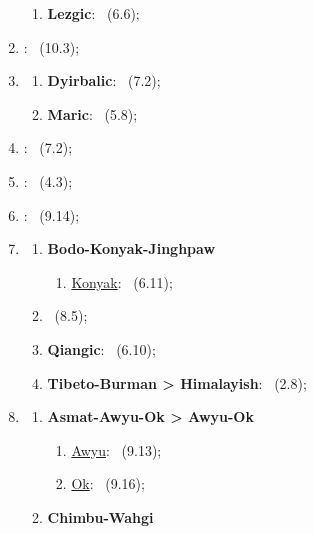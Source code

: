 \begin{enumerate}
    \begin{enumerate}
        \item \textbf{Lezgic}: \langnameTabasaran\ (6.6);
    \end{enumerate}
    \item \MakeUppercase{\textbf{\langfamily{\famNyulnyulan}}}: \langnameBardi\ (10.3);
    \item \MakeUppercase{\textbf{\langfamily{\famPamaNyungan}}}
    \begin{enumerate}
        \item \textbf{Dyirbalic}: \langnameDyirbal\ (7.2);
        \item \textbf{Maric}: \langnameFitzroy\ (5.8);
    \end{enumerate}
    \item \MakeUppercase{\textbf{\langfamily{\famPenutian}}}: \langnameNezPerce\ (7.2);
    \item \MakeUppercase{\textbf{\langfamily{\famQuechuan}}}: \langnameQuechua\ (4.3);
    \item \MakeUppercase{\textbf{\langfamily{\famSepik}}}: \langnameAlamblak\ (9.14);
    \item \MakeUppercase{\textbf{\langfamily{\famSinoTibetan}}}
    \begin{enumerate}
        \item \textbf{Bodo-Konyak-Jinghpaw}
        \begin{enumerate}
            \item \uline{Konyak}: \langnameHakhun\ (6.11);
        \end{enumerate}
        \item \langnameChinese\ (8.5);
        \item \textbf{Qiangic}: \langnameGyarung\ (6.10);
        \item \textbf{Tibeto-Burman > Himalayish}: \langnameLepcha\ (2.8);
    \end{enumerate}
    \item \MakeUppercase{\textbf{\langfamily{\famTNG}}}
    \begin{enumerate}
        \item \textbf{Asmat-Awyu-Ok > Awyu-Ok}
        \begin{enumerate}
            \item \uline{Awyu}: \langnameVambon\ (9.13);
            \item \uline{Ok}: \langnameTifal\ (9.16);
        \end{enumerate}
        \item \textbf{Chimbu-Wahgi}

\end{enumerate}
\end{enumerate}
